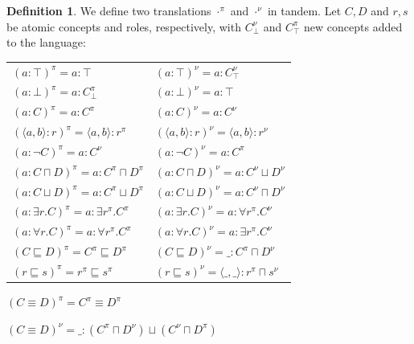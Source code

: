 \documentclass[letterpaper]{article} %
\theoremstyle{definition}
\theoremstyle{definition}
\newtheorem{definition}{Definition}
\theoremstyle{definition}
\theoremstyle{definition}
\theoremstyle{definition}
\begin{document}
\begin{definition}
    We define two translations $\cdot^{\pi}$ and $\cdot^{\nu}$ in tandem. Let $C,D$ and $r,s$ be atomic concepts and roles, respectively, with $C_{\bot}^{\nu}$ and $C_{\top}^{\pi}$ new concepts added to the language:


    \begin{center}
    {\small
   
    \begin{tabular}{ll}

$(a:\top)^{\pi}=a:\top$ & $(a:\top)^{\nu}=a:C_{\top}^{\nu}$ \\

$(a:\bot)^{\pi}=a:C_{\bot}^{\pi}$ & $(a:\bot)^{\nu}=a:\top$ \\

$(a:C)^{\pi}=a:C^{\pi}$ & $(a:C)^{\nu}=a:C^{\nu}$ \\

$(\langle a,b\rangle:r)^{\pi}=\langle a,b\rangle:r^{\pi}$ & $(\langle a,b\rangle:r)^{\nu}=\langle a,b\rangle:r^{\nu}$ \\

$( a:\neg C)^{\pi}=a:C^{\nu}$ & $(a:\neg C)^{\nu}=a:C^{\pi}$ \\

$(a:C\sqcap D)^{\pi}=a:C^{\pi}\sqcap D^{\pi}$ & $(a:C\sqcap D)^{\nu}=a:C^{\nu}\sqcup D^{\nu}$\\

$(a:C\sqcup D)^{\pi}=a:C^{\pi}\sqcup D^{\pi}$ & $(a:C\sqcup D)^{\nu}=a:C^{\nu}\sqcap D^{\nu}$\\

$(a:\exists r.C)^{\pi}=a:\exists r^{\pi}.C^{\pi}$ & $(a:\exists r.C)^{\nu}=a:\forall r^{\pi}.C^{\nu}$\\

$(a:\forall r.C)^{\pi}=a:\forall r^{\pi}.C^{\pi}$ & $(a:\forall r.C)^{\nu}=a:\exists r^{\pi}.C^{\nu}$\\

$(C\sqsubseteq D)^{\pi}=C^{\pi}\sqsubseteq D^{\pi}$ & $(C\sqsubseteq D)^{\nu}=\_:C^{\pi}\sqcap D^{\nu}$\\




$(r\sqsubseteq s)^{\pi}=r^{\pi}\sqsubseteq s^{\pi}$ & $(r\sqsubseteq s)^{\nu}=\langle \_,\_\rangle: r^{\pi}\sqcap s^{\nu}$\\
\end{tabular}

$(C\equiv D)^{\pi}=C^{\pi}\equiv D^{\pi}$ 

$(C\equiv D)^{\nu}=\_:(C^{\pi}\sqcap D^{\nu})\sqcup(C^{\nu}\sqcap D^{\pi})$
}
\end{center}
\end{definition}
\end{document}
